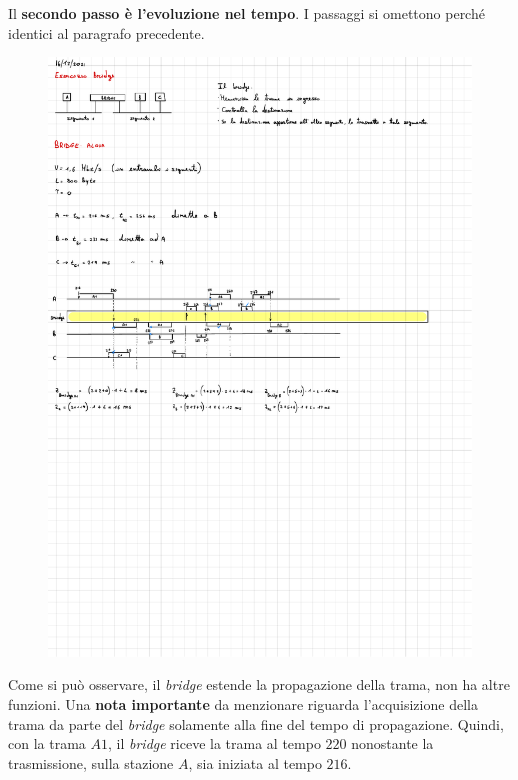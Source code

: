 \documentclass[a4paper]{article}
\begin{document}
	\noindent
	Il \textbf{secondo passo è l'evoluzione nel tempo}. I passaggi si omettono perché identici al paragrafo precedente.
	\begin{figure}[!htp]
		\centering
		\includegraphics[width=\textwidth]{img/ex1_bridge-ALOHA.pdf}
	\end{figure}
	
	\noindent
	Come si può osservare, il \emph{bridge} estende la propagazione della trama, non ha altre funzioni. Una \textbf{nota importante} da menzionare riguarda l'acquisizione della trama da parte del \emph{bridge} solamente alla fine del tempo di propagazione. Quindi, con la trama $A1$, il \emph{bridge} riceve la trama al tempo $220$ nonostante la trasmissione, sulla stazione $A$, sia iniziata al tempo $216$.\newline
	
\end{document}
